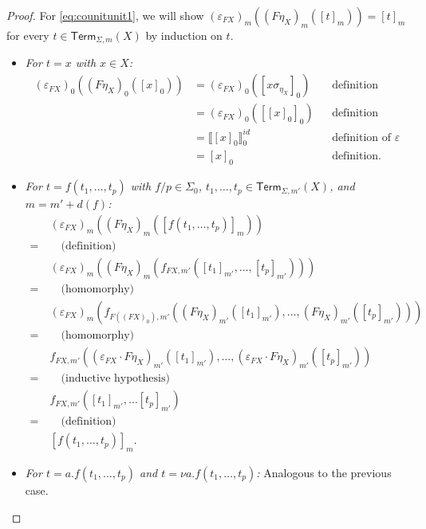 \documentclass[11pt,a4paper]{amsart}
\newcommand{\Term}{\mathsf{Term}}
\newcommand{\sig}{\Sigma}
\newcommand{\sigp}{\Sigma_0}
\theoremstyle{plain}
\newcommand{\id}{\mathit{id}}
\numberwithin{equation}{section}
\newcommand{\+}[1]{\mathcal{#1}\xspace}
\theoremstyle{definition}
\begin{document}
\begin{proof}
    For \eqref{eq:counitunit1}, we will show \((\varepsilon_{FX})_m((F\eta_X)_m([t]_m)) = [t]_m\) for every \(t \in \Term_{\sig, m}(X)\) by induction on \(t\).
    \begin{itemize}
        \item
            \textit{For \(t = x\) with \(x \in X\):}
            \begin{align*}
                (\varepsilon_{FX})_0((F\eta_X)_0([x]_0))
                &= (\varepsilon_{FX})_0([x\sigma_{\eta_X}]_0) && \text{definition} \\
                &= (\varepsilon_{FX})_0([[x]_0]_0) && \text{definition} \\
                &= \llbracket [x]_0 \rrbracket^{\id}_0 && \text{definition of } \varepsilon \\
                &= [x]_0 && \text{definition}.
            \end{align*}
        \item
            \textit{For \(t = f(t_1, \ldots, t_p)\) with \(f/p \in \sigp\), \(t_1, \ldots, t_p \in \Term_{\sig, m'}(X)\), and \(m = m' + d(f)\):}
            \begin{align*}
                &(\varepsilon_{FX})_m((F\eta_X)_m([f(t_1, \ldots, t_p)]_m)) \\
                =~&\quad\text{(definition)} \\
                &(\varepsilon_{FX})_m((F\eta_X)_m(f_{FX, m'}([t_1]_{m'}, \ldots, [t_p]_{m'}))) \\
                =~&\quad\text{(homomorphy)} \\
                &(\varepsilon_{FX})_m(f_{F((FX)_0), m'}((F\eta_X)_{m'}([t_1]_{m'}), \ldots, (F\eta_X)_{m'}([t_p]_{m'}))) \\
                =~&\quad\text{(homomorphy)} \\
                &f_{FX, m'}((\varepsilon_{FX} \cdot F\eta_X)_{m'}([t_1]_{m'}), \ldots, (\varepsilon_{FX} \cdot F\eta_X)_{m'}([t_p]_{m'})) \\
                =~&\quad\text{(inductive hypothesis)} \\
                &f_{FX, m'}([t_1]_{m'}, \ldots [t_p]_{m'}) \\
                =~&\quad\text{(definition)} \\
                &[f(t_1, \ldots, t_p)]_m.
            \end{align*}
        \item
            \textit{For \(t = a.f(t_1, \ldots, t_p)\) and \(t = \nu a.f(t_1, \ldots, t_p)\):}
            Analogous to the previous case.
    \end{itemize}


\end{proof}
\end{document}
